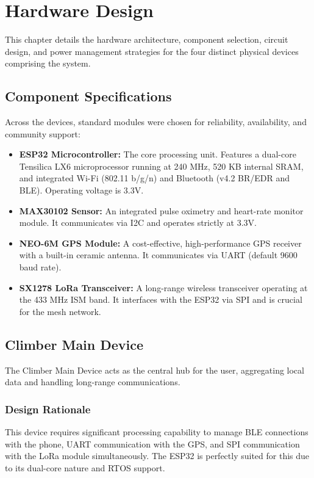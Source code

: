 \chapter{Hardware Design}
\label{ch:hardware-design}

This chapter details the hardware architecture, component selection, circuit design, and power management strategies for the four distinct physical devices comprising the system.

\section{Component Specifications}
Across the devices, standard modules were chosen for reliability, availability, and community support:
\begin{itemize}
    \item \textbf{ESP32 Microcontroller:} The core processing unit. Features a dual-core Tensilica LX6 microprocessor running at 240 MHz, 520 KB internal SRAM, and integrated Wi-Fi (802.11 b/g/n) and Bluetooth (v4.2 BR/EDR and BLE). Operating voltage is 3.3V.
    \item \textbf{MAX30102 Sensor:} An integrated pulse oximetry and heart-rate monitor module. It communicates via I2C and operates strictly at 3.3V.
    \item \textbf{NEO-6M GPS Module:} A cost-effective, high-performance GPS receiver with a built-in ceramic antenna. It communicates via UART (default 9600 baud rate).
    \item \textbf{SX1278 LoRa Transceiver:} A long-range wireless transceiver operating at the 433 MHz ISM band. It interfaces with the ESP32 via SPI and is crucial for the mesh network.
\end{itemize}

\section{Climber Main Device}
The Climber Main Device acts as the central hub for the user, aggregating local data and handling long-range communications.

\subsection{Design Rationale}
This device requires significant processing capability to manage BLE connections with the phone, UART communication with the GPS, and SPI communication with the LoRa module simultaneously. The ESP32 is perfectly suited for this due to its dual-core nature and RTOS support. 


